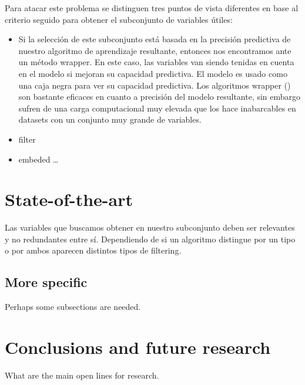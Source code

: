 \documentclass[a4paper,11pt]{article}
\begin{document}
Para atacar este problema se distinguen tres puntos de vista diferentes en base al criterio seguido para obtener el subconjunto de variables útiles:

\begin{itemize}
 
\item Si la selección de este subconjunto está basada en la precisión predictiva de nuestro algoritmo de aprendizaje resultante, entonces nos encontramos ante un método wrapper. En este caso, las variables van siendo tenidas en cuenta en el modelo si mejoran su capacidad predictiva. El modelo es usado como una caja negra para ver su capacidad predictiva. 
Los algoritmos wrapper (\cite{kohavi1997}) son bastante eficaces en cuanto a precisión del modelo resultante, sin embargo sufren de una carga computacional muy elevada que los hace inabarcables en datasets con un conjunto muy grande de variables.
\item filter
\item embeded \ldots 
\end{itemize} 



\section{State-of-the-art}

Las variables que buscamos obtener en nuestro subconjunto deben ser relevantes y no redundantes entre sí. Dependiendo de si un algoritmo distingue por un tipo o por ambos aparecen distintos tipos de filtering.

    \subsection{More specific}


Perhaps some subsections are needed.

\section{Conclusions and future research}

What are the main open lines for research.
\end{document}
